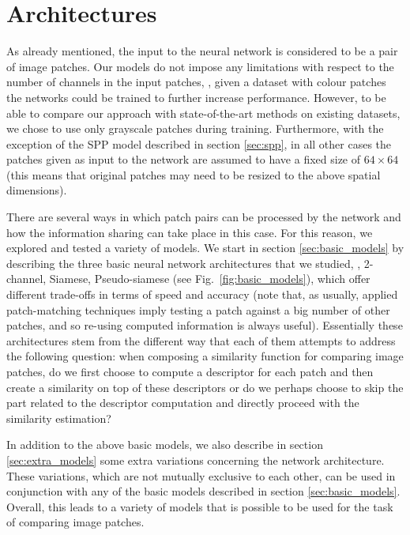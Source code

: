 \documentclass[10pt,twocolumn,letterpaper]{article}
\begin{document}
\section{Architectures}
As already mentioned, the input to the  neural network 
is considered to be a pair of image patches.  Our models do not 
impose any limitations with respect to the number of channels in the input patches, \ie, given a dataset with
colour patches the networks could be trained to further increase performance.
However, to be able to compare 
our approach with state-of-the-art methods on existing datasets, we chose to use only grayscale patches during training. 
Furthermore, with the exception of the SPP model described in section \ref{sec:spp}, in all other cases the  patches given as input to the network are  assumed to have  a fixed size of $64\times64$ (this means that original patches may need to be resized to the above spatial dimensions). 

There are several ways in which patch pairs can be processed by the network and how 
the information sharing can take place in this case. For this reason, we explored and tested a variety of models. We start in section \ref{sec:basic_models}  by describing   the three basic neural network architectures that we studied, \ie, 2-channel, Siamese, Pseudo-siamese (see Fig.~\ref{fig:basic_models}), which offer different trade-offs in terms of speed and 
accuracy (note that, as usually, applied patch-matching techniques imply testing a 
patch against a big number of other patches, and so re-using computed information is always useful). Essentially these architectures stem from the 
different way that each of them attempts to address the following question: when composing a similarity function for comparing image patches, do we   first choose to compute  a descriptor for each patch and then create a similarity on top of these descriptors or do we perhaps choose to skip the part related to the descriptor computation and directly proceed with the  similarity estimation? 

In addition to the above basic models, we also describe in section \ref{sec:extra_models} some extra  variations concerning the  network architecture. %
 These variations, which are not mutually exclusive to each other,  can be used in conjunction with any of the basic models described in section \ref{sec:basic_models}. %
Overall, this  leads to  a variety of  models that is possible to be used for the task of comparing image patches.


%
%
%
%
\end{document}
